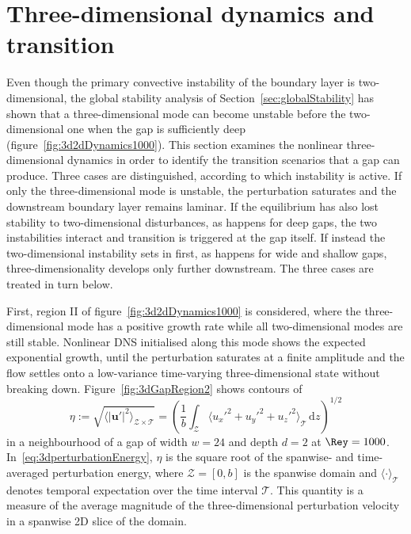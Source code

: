 \documentclass[lineno]{jfm}
\begin{document}
\section{Three-dimensional dynamics and transition}\label{sec:3Ddynamics}
Even though the primary convective instability of the boundary layer is two-dimensional, the global stability analysis of Section~\ref{sec:globalStability} has shown that a three-dimensional mode can become unstable before the two-dimensional one when the gap is sufficiently deep (figure~\ref{fig:3d2dDynamics1000}). This section examines the nonlinear three-dimensional dynamics in order to identify the transition scenarios that a gap can produce. Three cases are distinguished, according to which instability is active. If only the three-dimensional mode is unstable, the perturbation saturates and the downstream boundary layer remains laminar. If the equilibrium has also lost stability to two-dimensional disturbances, as happens for deep gaps, the two instabilities interact and transition is triggered at the gap itself. If instead the two-dimensional instability sets in first, as happens for wide and shallow gaps, three-dimensionality develops only further downstream. The three cases are treated in turn below.

First, region II of figure~\ref{fig:3d2dDynamics1000} is considered, where the three-dimensional mode has a positive growth rate while all two-dimensional modes are still stable. Nonlinear \ac{DNS} initialised along this mode shows the expected exponential growth, until the perturbation saturates at a finite amplitude and the flow settles onto a low-variance time-varying three-dimensional state without breaking down. Figure~\ref{fig:3dGapRegion2} shows contours of  
\begin{equation}\label{eq:3dperturbationEnergy}
	\eta:=\sqrt{{\langle|\boldsymbol{u}'|^2\rangle}_{\mathcal{Z}\times\mathcal{T}}}= {\left( \frac{1}{b}\int_{\mathcal{Z}} {\langle {u_x'}^2 + {u_y'}^2 + {u_z'}^2\rangle}_\mathcal{T}\, \mathrm{d}z\right)}^{1/2}
\end{equation}
in a neighbourhood of a gap of width $w=24$ and depth $d=2$ at $\Rey=1000$. In~\eqref{eq:3dperturbationEnergy}, $\eta$ is the square root of the spanwise- and time-averaged perturbation energy, where $\mathcal{Z}=[0,b]$ is the spanwise domain and ${\langle \cdot \rangle}_\mathcal{T}$ denotes temporal expectation over the time interval $\mathcal{T}$. This quantity is a measure of the average magnitude of the three-dimensional perturbation velocity in a spanwise 2D slice of the domain.
\end{document}
